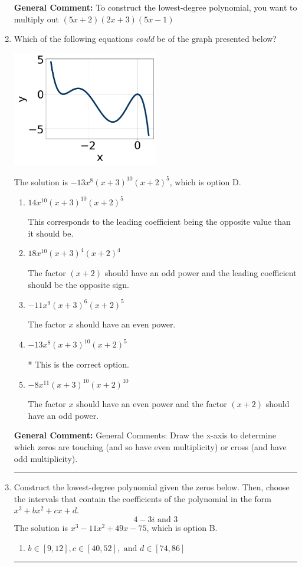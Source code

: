 \documentclass{extbook}[14pt]
\newcommand{\litem}[1]{\item #1

\rule{\textwidth}{0.4pt}}
\begin{document}
\begin{enumerate}
{\textbf{General Comment:} To construct the lowest-degree polynomial, you want to multiply out $(5x + 2)(2x + 3)(5x -1)$
}
\litem{
Which of the following equations \textit{could} be of the graph presented below?

\begin{center}
    \includegraphics[width=0.5\textwidth]{../Figures/polyGraphToFunctionCopyC.png}
\end{center}


The solution is \( -13x^{8} (x + 3)^{10} (x + 2)^{5} \), which is option D.\begin{enumerate}[label=\Alph*.]
\item \( 14x^{10} (x + 3)^{10} (x + 2)^{5} \)

This corresponds to the leading coefficient being the opposite value than it should be.
\item \( 18x^{10} (x + 3)^{4} (x + 2)^{4} \)

The factor $(x + 2)$ should have an odd power and the leading coefficient should be the opposite sign.
\item \( -11x^{9} (x + 3)^{6} (x + 2)^{5} \)

The factor $x$ should have an even power.
\item \( -13x^{8} (x + 3)^{10} (x + 2)^{5} \)

* This is the correct option.
\item \( -8x^{11} (x + 3)^{10} (x + 2)^{10} \)

The factor $x$ should have an even power and the factor $(x + 2)$ should have an odd power.
\end{enumerate}

\textbf{General Comment:} General Comments: Draw the x-axis to determine which zeros are touching (and so have even multiplicity) or cross (and have odd multiplicity).
}
\litem{
Construct the lowest-degree polynomial given the zeros below. Then, choose the intervals that contain the coefficients of the polynomial in the form $x^3+bx^2+cx+d$.
\[ 4 - 3 i \text{ and } 3 \]The solution is \( x^{3} -11 x^{2} +49 x -75 \), which is option B.\begin{enumerate}[label=\Alph*.]
\item \( b \in [9, 12], c \in [40, 52], \text{ and } d \in [74, 86] \)


\end{enumerate}}
\end{enumerate}
\end{document}
